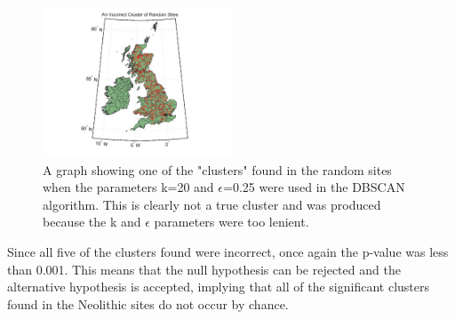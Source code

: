 \documentclass[a4paper]{article}
\begin{document}
\begin{figure}[H]
\centering
\includegraphics[width=0.5\textwidth]{ICRS.jpg}
\caption{\label{fig:ICRS}A graph showing one of the "clusters" found in the random sites when the parameters k=20 and $\epsilon$=0.25 were used in the DBSCAN algorithm. This is clearly not a true cluster and was produced because the k and $\epsilon$ parameters were too lenient.}
\end{figure}

Since all five of the clusters found were incorrect, once again the p-value was less than 0.001. This means that the null hypothesis can be rejected and the alternative hypothesis is accepted, implying that all of the significant clusters found in the Neolithic sites do not occur by chance. 
\end{document}
